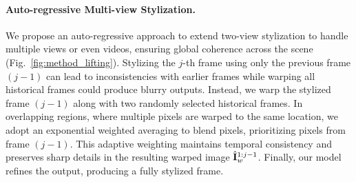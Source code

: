 \paragraph{Auto-regressive Multi-view Stylization.}
We propose an auto-regressive approach to extend two-view stylization to handle multiple views or even videos, ensuring global coherence across the scene (Fig.~\ref{fig:method_lifting}). Stylizing the $j$-th frame using only the previous frame $(j-1)$ can lead to inconsistencies with earlier frames while warping all historical frames could produce blurry outputs. Instead, we warp the stylized frame $(j-1)$ along with two randomly selected historical frames. In overlapping regions, where multiple pixels are warped to the same location, we adopt an exponential weighted averaging to blend pixels, prioritizing pixels from frame $(j-1)$. This adaptive weighting maintains temporal consistency and preserves sharp details in the resulting warped image $\hat{\mathbf{I}}_{w}^{1:j-1}$. Finally, our model refines the output, producing a fully stylized frame.
